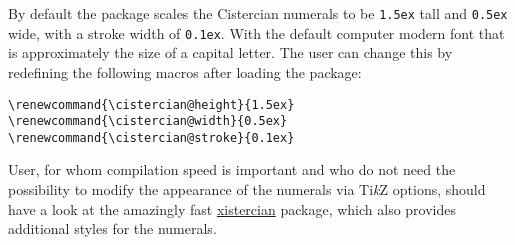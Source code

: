 \documentclass{scrartcl}
\makeatletter
\renewcommand{\cistercian@height}{1.25ex}
\renewcommand{\cistercian@stroke}{0.15ex}
\renewcommand{\cistercian@height}{1.25ex}%
\renewcommand{\cistercian@stroke}{0.15ex}%
\renewcommand{\cistercian@width}{0.5ex}%
\makeatother
\begin{document}
By default the package scales the Cistercian numerals to be \verb|1.5ex| tall and \verb|0.5ex| wide, with a stroke width of \verb|0.1ex|. 
With the default computer modern font that is approximately the size of a capital letter. 
The user can change this by redefining the following macros after loading the package:

\begin{verbatim}
\renewcommand{\cistercian@height}{1.5ex}
\renewcommand{\cistercian@width}{0.5ex}
\renewcommand{\cistercian@stroke}{0.1ex}
\end{verbatim}

User, for whom compilation speed is important and who do not need the possibility to modify the appearance of the numerals via Ti\emph{k}Z options, should have a look at the amazingly fast \href{https://ctan.org/pkg/xistercian}{xistercian} package, which also provides additional styles for the numerals. 
\end{document}
